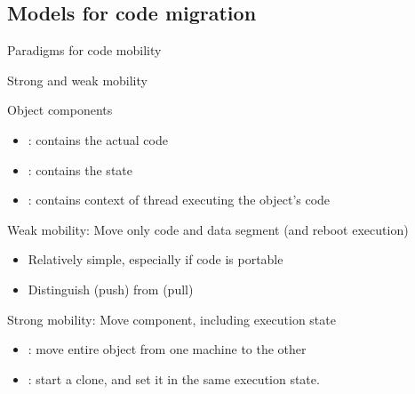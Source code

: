 \subsection{Models for code migration}
\begin{slide}{Paradigms for code mobility}
  \begin{centerfig}
  \end{centerfig}
\end{slide}
\begin{slide}{Strong and weak mobility}
  \begin{block}{Object components}
    \begin{itemize}
    \item {}: contains the actual code
    \item {}: contains the state
    \item {}: contains context of thread executing the object's code
    \end{itemize}
  \end{block}
  \begin{block}{Weak mobility: Move only code and data segment (and reboot execution)}
    \begin{itemize}
    \item Relatively simple, especially if code is portable
    \item Distinguish  (push) from  (pull)
    \end{itemize}
  \end{block}
  \begin{block}{Strong mobility: Move component, including execution state}
    \begin{itemize}
    \item {}: move entire object from one machine to the other
    \item {}: start a clone, and set it in the same execution state.
    \end{itemize}
  \end{block}
\end{slide}
